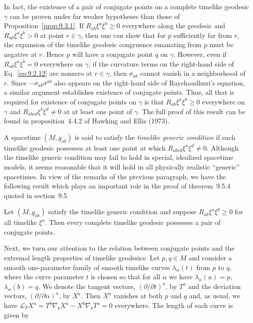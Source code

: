 In fact, the existence of a pair of conjugate points on a complete timelike geodesic
\(\gamma\) can be proven under far weaker hypotheses than those of
Proposition~\ref{prop:9.3.1}. If \(R_{ab}\xi^a\xi^b\geq0\) everywhere along the
geodesic and \(R_{ab}\xi^a\xi^b>0\) at point \(r\in\gamma\), then one can show that
for \(p\) sufficiently far from \(r\), the expansion of the timelike geodesic congruence
emanating from \(p\) must be negative at \(r\). Hence \(p\) will have a conjugate
point \(q\) on \(\gamma\). However, even if \(R_{ab}\xi^a\xi^b=0\) everywhere on
\(\gamma\), if the curvature terms on the right-hand side of Eq.~\eqref{eq:9.2.12} are
nonzero at \(r\in\gamma\), then \(\sigma_{ab}\) cannot vanish in a neighborhood of
\(r\). Since \(-\sigma_{ab}\sigma^{ab}\) also appears on the right-hand side of
Raychaudhuri's equation, a similar argument establishes existence of conjugate
points. Thus, all that is required for existence of conjugate points on \(\gamma\) is
that \(R_{ab}\xi^a\xi^b\geq0\) everywhere on \(\gamma\) and
\(R_{abcd}\xi^b\xi^d\ne0\) at at least one point of \(\gamma\). The full proof of this
result can be found in proposition~4.4.2 of Hawking and Ellis (1973).

A spacetime \((M,g_{ab})\) is said to satisfy the \emph{timelike generic condition} if each
timelike geodesic possesses at least one point at which \(R_{abcd}\xi^a\xi^d\ne0\).
Although the timelike generic condition may fail to hold in special, idealized spacetime
models, it seems reasonable that it will hold in all physically realistic ``generic''
spacetimes. In view of the remarks of the previous paragraph, we have the following
result which plays an important role in the proof of theorem~9.5.4 quoted in
section~9.5.

\begin{proposition}\label{prop:9.3.2}
Let \((M,g_{ab})\) satisfy the timelike generic condition and suppose
\(R_{ab}\xi^a\xi^b\geq0\) for all timelike \(\xi^a\). Then every complete timelike
geodesic possesses a pair of conjugate points.
\end{proposition}


Next, we turn our attention to the relation between conjugate points and the extremal
length properties of timelike geodesics. Let \(p,q\in M\) and consider a smooth
one-parameter family of smooth timelike curves \(\lambda_\alpha(t)\) from \(p\) to \(q\),
where the curve parameter \(t\) is chosen so that for all \(\alpha\) we have
\(\lambda_\alpha(a)=p\), \(\lambda_\alpha(b)=q\). We denote the tangent vectors,
\((\partial/\partial t)^a\), by \(T^a\) and the deviation vectors,
\((\partial/\partial\alpha)^a\), by \(X^a\). Then \(X^a\) vanishes at both \(p\) and
\(q\) and, as usual, we have
\(\mathcal L_TX^a=T^b\nabla_bX^a-X^b\nabla_bT^a=0\) everywhere. The length of each
curve is given by

